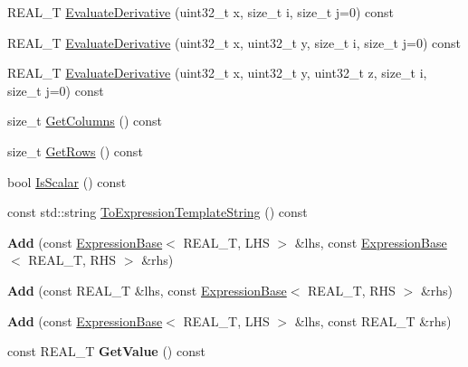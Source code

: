 \begin{DoxyCompactItemize}
\item 
R\+E\+A\+L\+\_\+\+T \hyperlink{structatl_1_1_add_a2d787c2c79b11cda6707af72554595d2}{Evaluate\+Derivative} (uint32\+\_\+t x, size\+\_\+t i, size\+\_\+t j=0) const 
\item 
R\+E\+A\+L\+\_\+\+T \hyperlink{structatl_1_1_add_aaafbede3e546a91c5201a507a30384ef}{Evaluate\+Derivative} (uint32\+\_\+t x, uint32\+\_\+t y, size\+\_\+t i, size\+\_\+t j=0) const 
\item 
R\+E\+A\+L\+\_\+\+T \hyperlink{structatl_1_1_add_ad2ce1f0c07eba054a060c0c59f2e1e18}{Evaluate\+Derivative} (uint32\+\_\+t x, uint32\+\_\+t y, uint32\+\_\+t z, size\+\_\+t i, size\+\_\+t j=0) const 
\item 
size\+\_\+t \hyperlink{structatl_1_1_add_a221c4901b9658ab182b8be2e22554d96}{Get\+Columns} () const 
\item 
size\+\_\+t \hyperlink{structatl_1_1_add_a1786888970115c87917cc4e9d8571d4f}{Get\+Rows} () const 
\item 
bool \hyperlink{structatl_1_1_add_a88202aac52b67fab9f56026dff51339b}{Is\+Scalar} () const 
\item 
const std\+::string \hyperlink{structatl_1_1_add_a07527a08caf7d42751c3dc28fb71f0be}{To\+Expression\+Template\+String} () const 
\item 
\hypertarget{structatl_1_1_add_ae5adbfbec484c5c3d723961c507cceff}{{\bfseries Add} (const \hyperlink{structatl_1_1_expression_base}{Expression\+Base}$<$ R\+E\+A\+L\+\_\+\+T, L\+H\+S $>$ \&lhs, const \hyperlink{structatl_1_1_expression_base}{Expression\+Base}$<$ R\+E\+A\+L\+\_\+\+T, R\+H\+S $>$ \&rhs)}\label{structatl_1_1_add_ae5adbfbec484c5c3d723961c507cceff}

\item 
\hypertarget{structatl_1_1_add_a9e21358db0817bce5b9c8043defc1bb6}{{\bfseries Add} (const R\+E\+A\+L\+\_\+\+T \&lhs, const \hyperlink{structatl_1_1_expression_base}{Expression\+Base}$<$ R\+E\+A\+L\+\_\+\+T, R\+H\+S $>$ \&rhs)}\label{structatl_1_1_add_a9e21358db0817bce5b9c8043defc1bb6}

\item 
\hypertarget{structatl_1_1_add_af3db07d03f92baf1728551fcda736ee2}{{\bfseries Add} (const \hyperlink{structatl_1_1_expression_base}{Expression\+Base}$<$ R\+E\+A\+L\+\_\+\+T, L\+H\+S $>$ \&lhs, const R\+E\+A\+L\+\_\+\+T \&rhs)}\label{structatl_1_1_add_af3db07d03f92baf1728551fcda736ee2}

\item 
\hypertarget{structatl_1_1_add_a2c34acd36affef45b59ca3e2cbcf81aa}{const R\+E\+A\+L\+\_\+\+T {\bfseries Get\+Value} () const }\label{structatl_1_1_add_a2c34acd36affef45b59ca3e2cbcf81aa}


\end{DoxyCompactItemize}

